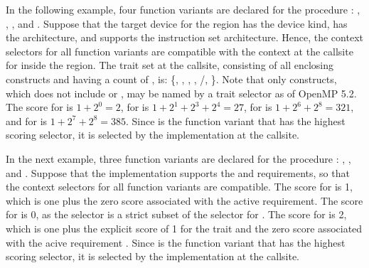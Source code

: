 In the following example, four function variants are declared for the procedure
: , , , and . Suppose that
the target device for the  region has the  device kind,
has the  architecture, and supports the  instruction set
architecture. Hence, the context selectors for all function variants are
compatible with the context at the callsite for  inside the
 region. The  trait set at the callsite,
consisting of all enclosing constructs and having a count of , is:
\{, , , ,
/, \}. Note that only 
constructs, which does not include  or , may be
named by a  trait selector as of OpenMP 5.2. The score for
 is $1+2^0=2$, for  is $1+2^1+2^3+2^4=27$,
for  is $1+2^6+2^8=321$, and for  is $1+2^7+2^8=385$.
Since  is the function variant that has the highest scoring
selector, it is selected by the implementation at the callsite.



In the next example, three function variants are declared for the procedure
: , , and 
. Suppose that the implementation supports the 
 and  requirements, so that
the context selectors for all function variants are compatible. The score for 
 is 1, which is one plus the zero score associated with
the active  requirement. The score for 
 is 0, as the selector is a strict subset of the 
selector for . The score for 
 is 2, which is one plus the explicit score of 1
for the  trait and the zero score associated with the acive
 requirement . Since 
is the function variant that has the highest scoring selector, it is selected
by the implementation at the callsite.


